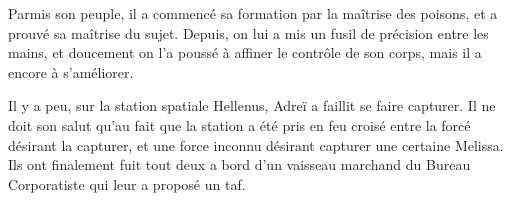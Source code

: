 \documentclass{DenebClass}
\begin{document}
Parmis son peuple, il a commencé sa formation par la maîtrise des poisons, et a prouvé sa maîtrise du sujet. Depuis, on lui a mis un fusil de précision entre les mains, et doucement on l'a poussé à affiner le contrôle de son corps, mais il a encore à s'améliorer.

Il y a peu, sur la station spatiale Hellenus, Adreï a faillit se faire capturer. Il ne doit son salut qu'au fait que la station a été pris en feu croisé entre la forcé désirant la capturer, et une force inconnu désirant capturer une certaine Melissa. Ils ont finalement fuit tout deux a bord d'un vaisseau marchand du Bureau Corporatiste qui leur a proposé un taf.
\end{document}
